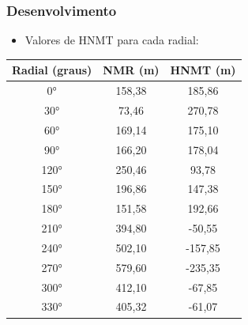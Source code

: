 \documentclass{beamer}
\begin{document}
    
        \begin{frame}
    
      \frametitle{Desenvolvimento}
      
      \begin{itemize}
      
      \item Valores de HNMT para cada radial:
      
      
       \end{itemize}
      \begin{center}
      
          \def\tablename{Tabela}
      \begin{table}
	\vspace*{0.05cm}
	\centering

	\begin{tabular}{|c|c|c|} \hline

	  Radial (graus) & NMR (m) & HNMT (m)\\ \hline
	  0° & 158,38&185,86\\
	  30° & 73,46 & 270,78\\
	  60° & 169,14 & 175,10\\
	  90° & 166,20 & 178,04\\
	  120° & 250,46 & 93,78\\
	  150° & 196,86 & 147,38\\
	  180° & 151,58 & 192,66\\
	  210° & 394,80 & -50,55\\
	  240° & 502,10 & -157,85\\
	  270° & 579,60 & -235,35\\
	  300° & 412,10 & -67,85\\
	  330°& 405,32 & -61,07\\ \hline

	\end{tabular}
      \end{table}		  		
      \end{center}
  
  
    \end{frame}
    
\end{document}
